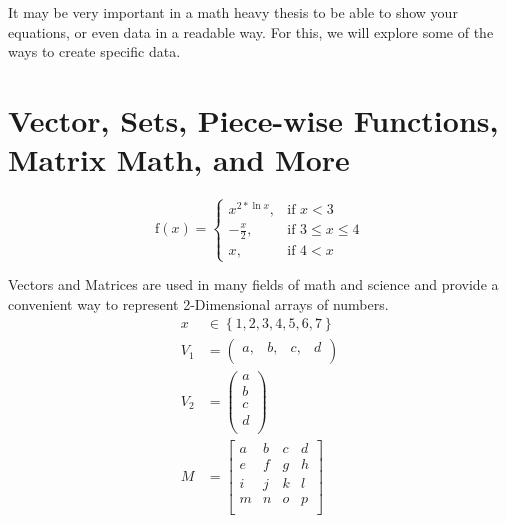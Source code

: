 	It may be very important in a math heavy thesis to be able to show your equations, or even data in a readable way. For this, we will explore some of the ways to create specific data.

	\section{Vector, Sets, Piece-wise Functions, Matrix Math, and More}
		\begin{equation}
			\text{f}(x) = 
				\begin{cases}
					x^{2*\ln{x}},&\text{if }x<3\\
					-\frac{x}{2},&\text{if }3\leq{}x\leq{}4\\
					x,&\text{if }4<x
				\end{cases}
		\end{equation}
	
		Vectors and Matrices are used in many fields of math and science and provide a convenient way to represent 2-Dimensional arrays of numbers.
		\begin{align}
			x&\in{}\left\{1,2,3,4,5,6,7\right\}\\
			V_{1} &= {\left(
			\begin{array}{cccc}
				a, & b, & c, & d\\
			\end{array}
			\right)}\\
			V_{2} &= \left(
			\begin{array}{c}
				a \\
				b \\
				c \\
				d \\
			\end{array}
			\right)\\
			M &= {\left[
			\begin{array}{cccc}
				a & b & c & d\\
				e & f & g & h\\
				i & j & k & l\\
				m & n & o & p\\
			\end{array}
			\right]}
		\end{align}